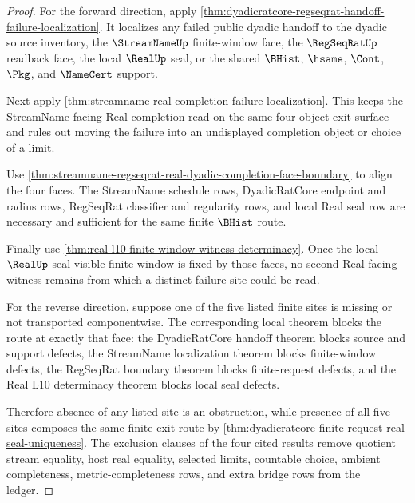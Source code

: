 \begin{proof}
For the forward direction, apply \autoref{thm:dyadicratcore-regseqrat-handoff-failure-localization}. It localizes any failed public dyadic handoff to the dyadic source inventory, the $\StreamNameUp$ finite-window face, the $\RegSeqRatUp$ readback face, the local $\RealUp$ seal, or the shared $\BHist$, $\hsame$, $\Cont$, $\Pkg$, and $\NameCert$ support.

Next apply \autoref{thm:streamname-real-completion-failure-localization}. This keeps the StreamName-facing Real-completion read on the same four-object exit surface and rules out moving the failure into an undisplayed completion object or choice of a limit.

Use \autoref{thm:streamname-regseqrat-real-dyadic-completion-face-boundary} to align the four faces. The StreamName schedule rows, DyadicRatCore endpoint and radius rows, RegSeqRat classifier and regularity rows, and local Real seal row are necessary and sufficient for the same finite $\BHist$ route.

Finally use \autoref{thm:real-l10-finite-window-witness-determinacy}. Once the local $\RealUp$ seal-visible finite window is fixed by those faces, no second Real-facing witness remains from which a distinct failure site could be read.

For the reverse direction, suppose one of the five listed finite sites is missing or not transported componentwise. The corresponding local theorem blocks the route at exactly that face: the DyadicRatCore handoff theorem blocks source and support defects, the StreamName localization theorem blocks finite-window defects, the RegSeqRat boundary theorem blocks finite-request defects, and the Real L10 determinacy theorem blocks local seal defects.

Therefore absence of any listed site is an obstruction, while presence of all five sites composes the same finite exit route by \autoref{thm:dyadicratcore-finite-request-real-seal-uniqueness}. The exclusion clauses of the four cited results remove quotient stream equality, host real equality, selected limits, countable choice, ambient completeness, metric-completeness rows, and extra bridge rows from the ledger.
\end{proof}

